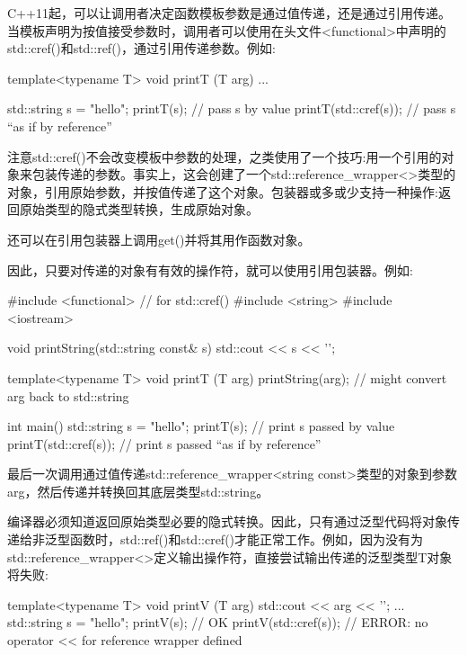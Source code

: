 C++11起，可以让调用者决定函数模板参数是通过值传递，还是通过引用传递。当模板声明为按值接受参数时，调用者可以使用在头文件<functional>中声明的std::cref()和std::ref()，通过引用传递参数。例如:

\begin{cpp}
template<typename T>
void printT (T arg) {
	...
}

std::string s = "hello";
printT(s); // pass s by value
printT(std::cref(s)); // pass s “as if by reference”
\end{cpp}

注意std::cref()不会改变模板中参数的处理，之类使用了一个技巧:用一个引用的对象来包装传递的参数。事实上，这会创建了一个std::reference\_wrapper<>类型的对象，引用原始参数，并按值传递了这个对象。包装器或多或少支持一种操作:返回原始类型的隐式类型转换，生成原始对象。

\begin{notice}还可以在引用包装器上调用get()并将其用作函数对象。
\end{notice}

因此，只要对传递的对象有有效的操作符，就可以使用引用包装器。例如:

\begin{cpp}
#include <functional> // for std::cref()
#include <string>
#include <iostream>

void printString(std::string const& s)
{
	std::cout << s << ’\n’;
}

template<typename T>
void printT (T arg)
{
	printString(arg); // might convert arg back to std::string
}

int main()
{
	std::string s = "hello";
	printT(s); // print s passed by value
	printT(std::cref(s)); // print s passed “as if by reference”
}
\end{cpp}

最后一次调用通过值传递std::reference\_wrapper<string const>类型的对象到参数arg，然后传递并转换回其底层类型std::string。

编译器必须知道返回原始类型必要的隐式转换。因此，只有通过泛型代码将对象传递给非泛型函数时，std::ref()和std::cref()才能正常工作。例如，因为没有为std::reference\_wrapper<>定义输出操作符，直接尝试输出传递的泛型类型T对象将失败:

\begin{cpp}
template<typename T>
void printV (T arg) {
	std::cout << arg << ’\n’;
}
...
std::string s = "hello";
printV(s); // OK
printV(std::cref(s)); // ERROR: no operator << for reference wrapper defined
\end{cpp}


